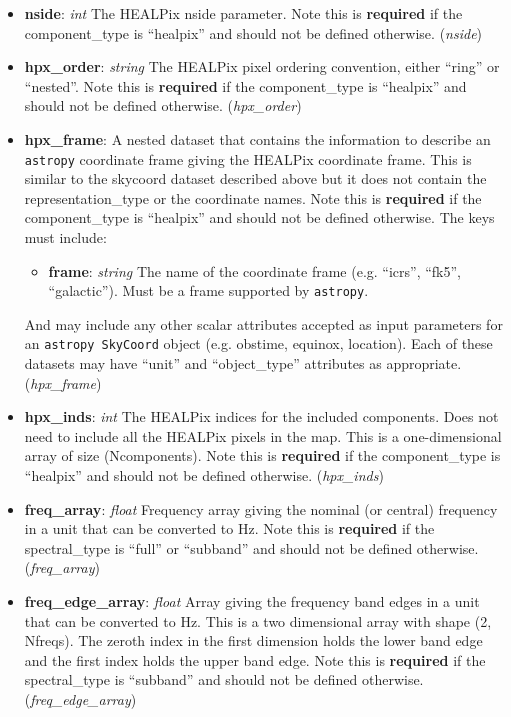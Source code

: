 \documentclass[11pt, oneside]{article}
\begin{document}
\begin{itemize}
\item \textbf{nside}: \textit{int}
The HEALPix nside parameter. Note this is \textbf{required} if the
component\_type is ``healpix'' and should not be defined otherwise.
(\textit{nside})

\item \textbf{hpx\_order}: \textit{string}
The HEALPix pixel ordering convention, either ``ring'' or ``nested''.
Note this is \textbf{required} if the component\_type is ``healpix'' and should
not be defined otherwise. (\textit{hpx\_order})

\item \textbf{hpx\_frame}:  A nested dataset that contains the information to
describe an \texttt{astropy} coordinate frame giving the HEALPix coordinate
frame. This is similar to the skycoord dataset described above but it does not
contain the representation\_type or the coordinate names.
Note this is \textbf{required} if the component\_type is ``healpix'' and should
not be defined otherwise. The keys must include:
	\begin{itemize}
	\item \textbf{frame}: \textit{string} The name of the coordinate frame
	(e.g. ``icrs'', ``fk5'', ``galactic''). Must be a frame supported by
	\texttt{astropy}.
	\end{itemize}
And may include any other scalar attributes accepted as input parameters
for an \texttt{astropy SkyCoord} object (e.g. obstime, equinox, location). Each
of these datasets may have ``unit'' and ``object\_type'' attributes as appropriate.
(\textit{hpx\_frame})

\item \textbf{hpx\_inds}: \textit{int}
The HEALPix indices for the included components. Does not need to include
all the HEALPix pixels in the map. This is a one-dimensional array of size
(Ncomponents). Note this is \textbf{required} if the component\_type is
``healpix'' and should not be defined otherwise. (\textit{hpx\_inds})

\item \textbf{freq\_array}: \textit{float}
Frequency array giving the nominal (or central) frequency in a unit that can be
converted to Hz. Note this is \textbf{required} if the spectral\_type is ``full'' or
``subband'' and should not be defined otherwise. (\textit{freq\_array})

\item \textbf{freq\_edge\_array}: \textit{float}
Array giving the frequency band edges in a unit that can be converted to Hz.
This is a two dimensional array with shape (2, Nfreqs). The zeroth index in
the first dimension holds the lower band edge and the first index holds the
upper band edge. Note this is \textbf{required} if the spectral\_type is
``subband'' and should not be defined otherwise. (\textit{freq\_edge\_array})


\end{itemize}
\end{document}
